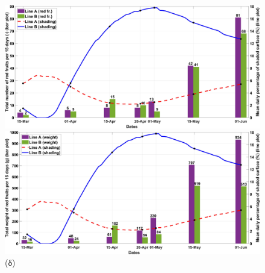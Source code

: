 \documentclass[12pt, a4paper]{report} %
\begin{document}
\begin{figure}[H]
\begin{adjustwidth}{-0.5cm}{0cm}
        \medskip

        \begin{minipage}[c]{0.5\textwidth}
            \centering
            \includegraphics[scale=0.05]{red_weight_c.jpg}
            \caption*{\hspace{35pt}(γ)}{}
        \end{minipage}
        \hfill
        \begin{minipage}[c]{0.5\textwidth}
            \centering
            \includegraphics[scale=0.05]{red_weight_d.jpg}
            \caption*{\hspace{35pt}(δ)}{}
        \end{minipage}

        \medskip


\end{adjustwidth}
\end{figure}
\end{document}
